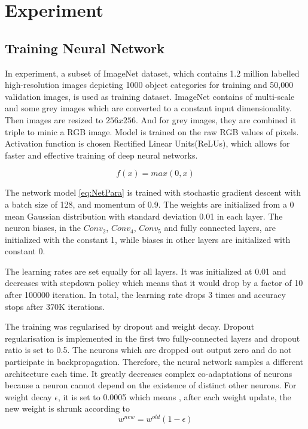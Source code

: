 
\chapter{Experiment} %
\label{Chapter4}

\section{Training Neural Network}

In experiment, a subset of ImageNet dataset, which contains 1.2 million labelled high-resolution images depicting 1000 object categories for training and 50,000 validation images, is used as training dataset. ImageNet contains of multi-scale and some grey images which are converted to a constant input dimensionality. Then images are resized to $256x256$. And for grey images, they are combined it triple to minic a RGB image. Model is trained on the raw RGB values of pixels. Activation function is chosen  Rectified Linear Units(ReLUs), which allows for faster and effective training of deep neural networks.

\begin{equation}\label{eq:ReLU}
f(x) = max(0, x)
\end{equation}

The network model \ref{eq:NetPara} is trained with stochastic gradient descent with a batch size of 128, and momentum of 0.9. The weights are initialized from a $0$ mean Gaussian distribution with standard deviation 0.01 in each layer. The neuron biases, in the $Conv_{2}$, $Conv_{4}$, $Conv_{5}$ and fully connected layers, are initialized with the constant 1, while biases in other layers are initialized with constant 0.

The learning rates are set equally for all layers. It was initialized at 0.01 and decreases with stepdown policy which means that it would drop by a factor of 10 after 100000 iteration. In total, the learning rate drops 3 times and accuracy stops after 370K iterations. 

The training was regularised by dropout and weight decay. Dropout regularisation is implemented in the first two fully-connected layers and dropout ratio is set to 0.5. The neurons which are dropped out output zero and do not participate in backpropagation. Therefore, the neural network samples a different architecture each time. It greatly decreases complex co-adaptations of neurons because a neuron cannot depend on the existence of distinct other neurons. For weight decay $\epsilon$, it is set to 0.0005 which means , after each weight update, the new weight is shrunk according to 
\begin{equation}\label{eq:ffEq}
w^{new} = w^{old}(1 - \epsilon)
\end{equation}

